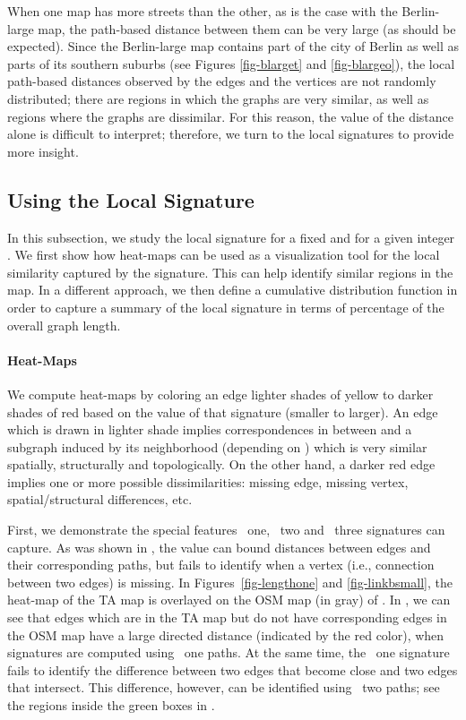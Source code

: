 When one map has more streets than the other, as is the case with the
Berlin-large map, the
path-based distance between them can be very large (as should be expected).
Since the Berlin-large map contains part of the city of Berlin
as well as parts of its southern suburbs (see Figures \ref{fig-blarget} and
\ref{fig-blargeo}), the local path-based distances observed by the edges and
the vertices are not randomly distributed; there are regions in which
the graphs are very similar, as well as regions where the graphs are dissimilar.
For this reason,
the value of the distance alone is difficult to interpret; therefore, we turn
to the local signatures to provide more insight.





\subsection{Using the Local Signature}
\label{subsec-experimentsSignature}

In this subsection, we study the local signature
 for a fixed  and
for a given integer . 
We first show how heat-maps can be used as a visualization tool for the local
similarity captured by the signature. This
can help identify similar regions in the map. In a different approach, we then
define a cumulative distribution function
in order to capture a summary of the local signature in terms of percentage of
the overall graph length.



\paragraph{Heat-Maps}
We compute heat-maps by coloring an edge lighter shades of yellow to darker
shades of red based on the value of that
signature (smaller to larger).  An edge  which is drawn in lighter
shade implies correspondences in  between 
and a subgraph induced by its neighborhood (depending on ) which is very
similar spatially, structurally and topologically.
On the other hand, a darker red edge implies one or more possible
dissimilarities: missing edge, missing vertex,
spatial/structural differences, etc.


First, we demonstrate the special features \length\ one, \length\ two and 
\length\
three signatures can capture.  As was shown in
, the value  can bound distances between
edges and their corresponding paths, but fails to identify when a
vertex (i.e.,  connection between two edges) is missing.  In 
Figures~\ref{fig-lengthone} and
\ref{fig-linkbsmall}, the heat-map of the 
TA map is overlayed on the OSM map (in gray) of \bsmall.  In
, we can see that edges which are in the TA map but do not 
have corresponding edges in the OSM map have a large directed distance 
(indicated by the red color), when signatures
are computed using \length\ one paths.  
At the same time, the \length\ one signature fails to identify 
the  difference between two edges that
become close and two edges that intersect.  This difference, however, can be
identified
using \length\ two paths; see the regions inside the green boxes in
\figref{linkbsmall}.


